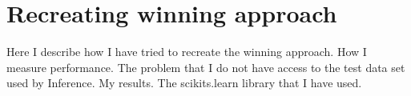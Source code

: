 \chapter{Recreating winning approach}
Here I describe how I have tried to recreate the winning approach. How I measure performance. The problem that I do not have access to the test data set used by Inference. My results. The scikits.learn library that I have used.

